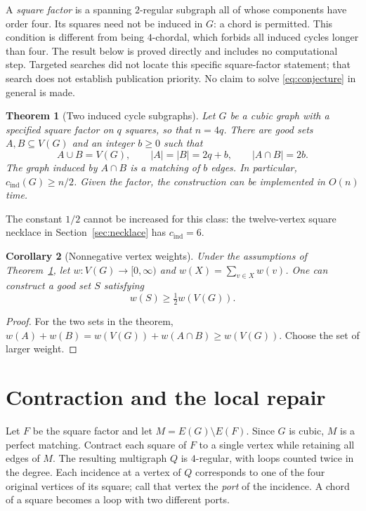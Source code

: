 \documentclass[11pt]{article}
\newtheorem{theorem}{Theorem}[section]
\newtheorem{corollary}[theorem]{Corollary}
\newcommand{\cind}{c_{\mathrm{ind}}}
\begin{document}
A \emph{square factor} is a spanning $2$-regular subgraph all of whose
components have order four. Its squares need not be induced in $G$:
a chord is permitted. This condition is different from being
$4$-chordal, which forbids all induced cycles longer than four.
The result below is proved directly and includes no computational step.
Targeted searches did not locate this specific square-factor
statement; that search does not establish publication priority.
No claim to solve \eqref{eq:conjecture} in general is made.

\begin{theorem}[Two induced cycle subgraphs]\label{thm:main}
Let $G$ be a cubic graph with a specified square factor on $q$ squares,
so that $n=4q$. There are good sets $A,B\subseteq V(G)$ and an integer
$b\geq0$ such that
\[
 A\cup B=V(G),\qquad |A|=|B|=2q+b,\qquad |A\cap B|=2b.
\]
The graph induced by $A\cap B$ is a matching of $b$ edges.
In particular, $\cind(G)\geq n/2$.
Given the factor, the construction can be implemented in $O(n)$ time.
\end{theorem}

The constant $1/2$ cannot be increased for this class: the twelve-vertex
square necklace in Section~\ref{sec:necklace} has $\cind=6$.

\begin{corollary}[Nonnegative vertex weights]\label{cor:weighted}
Under the assumptions of Theorem~\ref{thm:main}, let
$w:V(G)\to[0,\infty)$ and $w(X)=\sum_{v\in X}w(v)$.
One can construct a good set $S$ satisfying
\[
 w(S)\geq \tfrac12 w(V(G)).
\]
\end{corollary}
\begin{proof}
For the two sets in the theorem,
$w(A)+w(B)=w(V(G))+w(A\cap B)\geq w(V(G))$.
Choose the set of larger weight.
\end{proof}

\section{Contraction and the local repair}
Let $F$ be the square factor and let $M=E(G)\setminus E(F)$.
Since $G$ is cubic, $M$ is a perfect matching.
Contract each square of $F$ to a single vertex while retaining all edges
of $M$. The resulting multigraph $Q$ is $4$-regular, with loops counted
twice in the degree. Each incidence at a vertex of $Q$ corresponds to
one of the four original vertices of its square; call that vertex
the \emph{port} of the incidence. A chord of a square becomes a loop
with two different ports.
\end{document}
